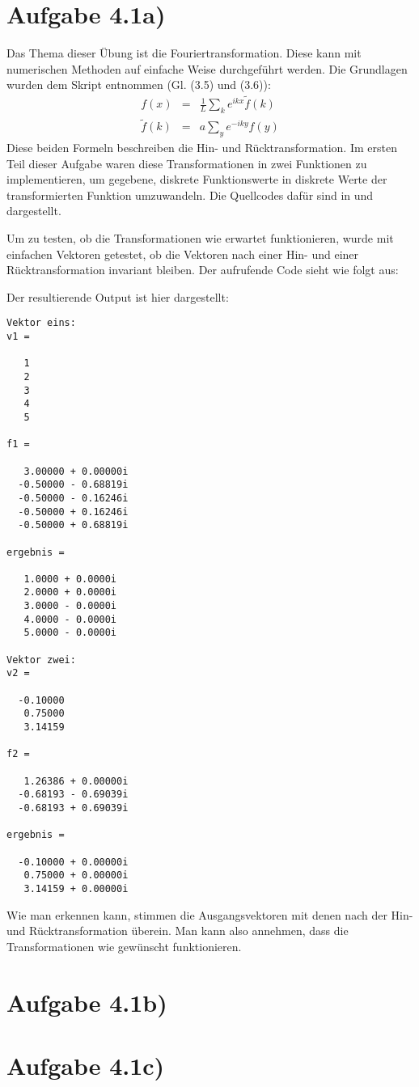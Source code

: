 \section*{Aufgabe 4.1a)}
Das Thema dieser Übung ist die Fouriertransformation. Diese kann mit numerischen
Methoden auf einfache Weise durchgeführt werden. Die Grundlagen wurden dem Skript
entnommen (Gl. (3.5) und (3.6)):
\begin{eqnarray}
f(x) &=& \frac{1}{L}\sum_k e^{ikx}\tilde{f}(k)\\
\tilde{f}(k) &=& a\sum_y e^{-iky} f(y)
\end{eqnarray}
Diese beiden Formeln beschreiben die Hin- und Rücktransformation. Im ersten Teil
dieser Aufgabe waren diese Transformationen in zwei Funktionen zu implementieren,
um gegebene, diskrete Funktionswerte in diskrete Werte der transformierten 
Funktion umzuwandeln. Die Quellcodes dafür sind in  und
 dargestellt.





Um zu testen, ob die Transformationen wie erwartet funktionieren, wurde mit einfachen
Vektoren getestet, ob die Vektoren nach einer Hin- und einer Rücktransformation
invariant bleiben. Der aufrufende Code sieht wie folgt aus:



Der resultierende Output ist hier dargestellt: 

\begin{lstlisting}[caption=Output des Beispielaufrufs,label=lst:fouriertestoutput]
Vektor eins: 
v1 =

   1
   2
   3
   4
   5

f1 =

   3.00000 + 0.00000i
  -0.50000 - 0.68819i
  -0.50000 - 0.16246i
  -0.50000 + 0.16246i
  -0.50000 + 0.68819i

ergebnis =

   1.0000 + 0.0000i
   2.0000 + 0.0000i
   3.0000 - 0.0000i
   4.0000 - 0.0000i
   5.0000 - 0.0000i

Vektor zwei: 
v2 =

  -0.10000
   0.75000
   3.14159

f2 =

   1.26386 + 0.00000i
  -0.68193 - 0.69039i
  -0.68193 + 0.69039i

ergebnis =

  -0.10000 + 0.00000i
   0.75000 + 0.00000i
   3.14159 + 0.00000i
\end{lstlisting}

Wie man erkennen kann, stimmen die Ausgangsvektoren mit denen nach der Hin- und
Rücktransformation überein. Man kann also annehmen, dass die Transformationen wie
gewünscht funktionieren.

\section*{Aufgabe 4.1b)}


\section*{Aufgabe 4.1c)}
